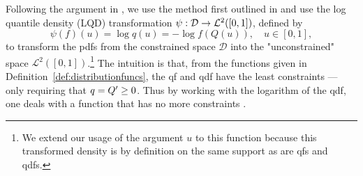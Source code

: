Following the argument in \textcite{KokoszkaEtAl2019}, we use the method first outlined
in \textcite{PetersenMüller2016} and use the log quantile density (LQD) transformation
$\psi : \nobreak \mathcal{D} \to \mathcal{L}^2([0,1])$, defined by
\begin{equation}
    \label{eq:lqd_definition}
    \psi (f)(u) = \log q(u) = -\log f(Q(u)), \quad u \in [0,1],
\end{equation}
to transform the pdfs from the constrained space $\mathcal{D}$ into the "unconstrained"
space $\mathcal{L}^2([0,1])$.\footnote{We extend our usage of the argument $u$ to this
function because this transformed density is by definition on the same support as are
qfs and qdfs.} The intuition is that, from the functions given in
Definition~\ref{def:distributionfuncs}, the qf and qdf have the least constraints ---
only requiring that $q = \nobreak Q' \geq \nobreak 0$. Thus by working with the logarithm
of the qdf, one deals with a function that has no more constraints \parencite[cf.][]{KokoszkaEtAl2019}.


